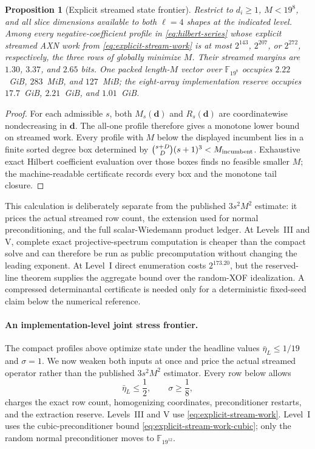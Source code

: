 \documentclass[11pt]{article}
\newtheorem{proposition}[proposition]{Proposition}
\newcommand{\F}{\mathbb F}
\begin{document}
\begin{proposition}[Explicit streamed state frontier]
\label{prop:explicit-stream-frontier}
Restrict to $d_i\ge1$, $M<19^8$, and all slice dimensions available to both
$\ell=4$ shapes at the indicated level.  Among every negative-coefficient
profile in \eqref{eq:hilbert-series} whose explicit streamed AXN work from
\eqref{eq:explicit-stream-work} is at most $2^{143}$, $2^{207}$, or
$2^{272}$, respectively, the three rows of 
globally minimize $M$.  Their streamed margins are $1.30$, $3.37$, and
$2.65$ bits.  One packed length-$M$ vector over $\F_{19^8}$ occupies
$2.22$~GiB, $283$~MiB, and $127$~MiB; the eight-array implementation reserve
occupies $17.7$~GiB, $2.21$~GiB, and $1.01$~GiB.
\end{proposition}

\begin{proof}
For each admissible $s$, both $M_s(\mathbf d)$ and
$R_s(\mathbf d)$ are coordinatewise nondecreasing in $\mathbf d$.  The
all-one profile therefore gives a monotone lower bound on streamed work.
Every profile with $M$ below the displayed incumbent lies in a finite sorted
degree box determined by
$\binom{s+D}{D}(s+1)^3<M_{\rm incumbent}$.  Exhaustive exact Hilbert
coefficient evaluation over those boxes finds no feasible smaller $M$; the
machine-readable certificate records every box and the monotone tail closure.
\end{proof}

This calculation is deliberately separate from the published
$3s^2M^2$ estimate: it prices the actual streamed row count, the extension
used for normal preconditioning, and the full scalar-Wiedemann product ledger.
At Levels~III and V, complete exact projective-spectrum computation is cheaper
than the compact solve and can therefore be run as public precomputation
without changing the leading exponent.  At Level~I direct enumeration costs
$2^{173.20}$, but the reserved-line theorem supplies the aggregate bound over
the random-XOF idealization.  A compressed determinantal certificate is needed
only for a deterministic fixed-seed claim below the numerical reference.

\paragraph{An implementation-level joint stress frontier.}
The compact profiles above optimize state under the headline values
$\bar\eta_L\le1/19$ and $\sigma=1$.  We now weaken both inputs at once and
price the actual streamed operator rather than the published $3s^2M^2$
estimator.  Every row below allows
\begin{equation}\label{eq:robust-inputs}
 \bar\eta_L\le\frac12,
 \qquad
 \sigma\ge\frac18,
\end{equation}
charges the exact row count, homogenizing coordinates, preconditioner restarts,
and the extraction reserve.  Levels~III and V use
\eqref{eq:explicit-stream-work}.  Level~I uses the cubic-preconditioner bound
\eqref{eq:explicit-stream-work-cubic}; only the random normal preconditioner
moves to $\F_{19^{12}}$.
\end{document}
